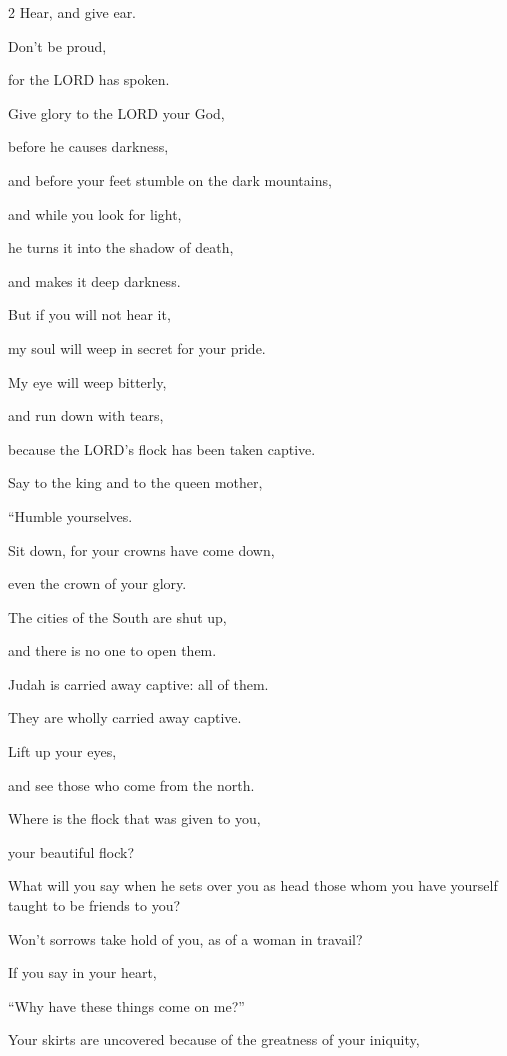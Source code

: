 \begin{multicols}{2}
	\myverse{}Hear, and give ear.
	
	Don’t be proud,
	
	for the LORD has spoken.
	
	
	\myverse{}Give glory to the LORD your God,
	
	before he causes darkness,
	
	and before your feet stumble on the dark mountains,
	
	and while you look for light,
	
	he turns it into the shadow of death,
	
	and makes it deep darkness.
	
	
	\myverse{}But if you will not hear it,
	
	my soul will weep in secret for your pride.
	
	My eye will weep bitterly,
	
	and run down with tears,
	
	because the LORD’s flock has been taken captive.
	
	
	\myverse{}Say to the king and to the queen mother,
	
	“Humble yourselves.
	
	Sit down, for your crowns have come down,
	
	even the crown of your glory.
	
	
	\myverse{}The cities of the South are shut up,
	
	and there is no one to open them.
	
	Judah is carried away captive: all of them.
	
	They are wholly carried away captive.
	
	
	\myverse{}Lift up your eyes,
	
	and see those who come from the north.
	
	Where is the flock that was given to you,
	
	your beautiful flock?
	
	
	\myverse{}What will you say when he sets over you as head those whom
	you have yourself taught to be friends to you?
	
	Won’t sorrows take hold of you, as of a woman in travail?
	
	
	\myverse{}If you say in your heart,
	
	“Why have these things come on me?”
	
	Your skirts are uncovered because of the greatness of your iniquity,
	

\end{multicols}

